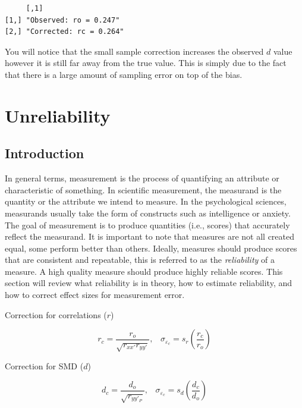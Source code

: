 \documentclass[
  letterpaper,
  DIV=11,
  numbers=noendperiod]{scrreprt}
\begin{document}
\begin{verbatim}
     [,1]                   
[1,] "Observed: ro = 0.247" 
[2,] "Corrected: rc = 0.264"
\end{verbatim}

You will notice that the small sample correction increases the observed
\(d\) value however it is still far away from the true value. This is
simply due to the fact that there is a large amount of sampling error on
top of the bias.

\hypertarget{unreliability}{%
\chapter{Unreliability}\label{unreliability}}

\hypertarget{introduction-1}{%
\section{Introduction}\label{introduction-1}}

In general terms, measurement is the process of quantifying an attribute
or characteristic of something. In scientific measurement, the measurand
is the quantity or the attribute we intend to measure. In the
psychological sciences, measurands usually take the form of constructs
such as intelligence or anxiety. The goal of measurement is to produce
quantities (i.e., scores) that accurately reflect the measurand. It is
important to note that measures are not all created equal, some perform
better than others. Ideally, measures should produce scores that are
consistent and repeatable, this is referred to as the \emph{reliability}
of a measure. A high quality measure should produce highly reliable
scores. This section will review what reliability is in theory, how to
estimate reliability, and how to correct effect sizes for measurement
error.

\begin{tcolorbox}[enhanced jigsaw, opacitybacktitle=0.6, breakable, bottomtitle=1mm, colbacktitle=quarto-callout-note-color!10!white, bottomrule=.15mm, titlerule=0mm, toprule=.15mm, left=2mm, opacityback=0, colframe=quarto-callout-note-color-frame, title={\faIcon{bolt} Too long didn't read?}, leftrule=.75mm, coltitle=black, colback=white, rightrule=.15mm, arc=.35mm, toptitle=1mm]

Correction for correlations (\(r\))

\[r_c = \frac{r_o}{\sqrt{r_{xx'}r_{yy'}}},\;\;\; \sigma_{\varepsilon_c} = s_r \left(\frac{r_c}{r_o}\right)\]

Correction for SMD (\(d\))

\[d_c = \frac{d_o}{\sqrt{r_{yy'_P}}},\;\;\; \sigma_{\varepsilon_c} = s_d \left(\frac{d_c}{d_o}\right)\]

\end{tcolorbox}
\end{document}
